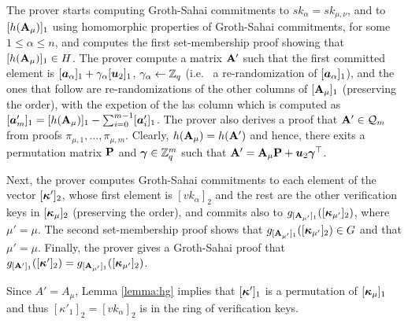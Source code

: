 The prover starts computing Groth-Sahai commitments to $sk_\alpha=sk_{\mu,\nu}$, and to $[h(\mathbf{{A}}_\mu)]_1$ using homomorphic properties of Groth-Sahai commitments, for some $1\leq \alpha \leq n$, and computes the first set-membership proof showing that $[h(\mathbf{{A}}_\mu)]_1\in H$.
The prover compute a matrix $\mathbf{{A}}'$ such that the first committed element is $[{\boldsymbol{a}}_\alpha]_1+\gamma_\alpha[{\boldsymbol{u}}_2]_1$, $\gamma_\alpha\gets\mathbb{Z}_q$ (i.e.~ a re-randomization of $[{\boldsymbol{a}}_\alpha]_1$), and the ones that follow are re-randomizations of the other columns of $[\mathbf{{A}}_\mu]_1$ (preserving the order), with the expetion of the las column which is computed as $[{\boldsymbol{a}}'_m]_1 = [h(\mathbf{{A}}_\mu)]_1-\sum_{i=0}^{m-1}[{\boldsymbol{a}}'_i]_1$. The prover also derives a proof that $\mathbf{{A}}'\in\mathcal{Q}_m$ from proofs $\pi_{\mu,1},\ldots,\pi_{\mu,m}$.
Clearly, $h(\mathbf{{A}}_\mu)=h(\mathbf{{A}}')$ and hence, there exits a permutation matrix $\mathbf{{P}}$ and ${\boldsymbol{\gamma}}\in\mathbb{Z}_q^m$ such that $\mathbf{{A}}' = \mathbf{{A}}_\mu\mathbf{{P}}+{\boldsymbol{u}}_2{\boldsymbol{\gamma}}^\top$.

Next, the prover computes Groth-Sahai commitments to each element of the vector $[{\boldsymbol{\kappa}}']_2$, whose first element is $[vk_\alpha]_2$ and the rest are the other verification keys in $[{\boldsymbol{\kappa}}_\mu]_2$ (preserving the order), and commits also to $g_{[\mathbf{{A_{\mu'}}}]_1}([{\boldsymbol{\kappa}}_{\mu'}]_2)$, where $\mu'=\mu$. The second set-membership proof shows that $g_{[\mathbf{{A_{\mu'}}}]_1}([{\boldsymbol{\kappa}}_{\mu'}]_2)\in G$ and that $\mu'=\mu$. Finally, the prover gives a Groth-Sahai proof that $g_{[\mathbf{{A}}']_1}([{\boldsymbol{\kappa}}']_2)=g_{[\mathbf{{A_{\mu'}}}]_1}([{\boldsymbol{\kappa}}_{\mu'}]_2)$.

Since $A'=A_\mu$, Lemma \ref{lemma:hg} implies that $[{\boldsymbol{\kappa}}']_1$ is a permutation of $[{\boldsymbol{\kappa}}_\mu]_1$ and thus $[\kappa'_1]_2=[vk_\alpha]_2$ is in the ring of verification keys.